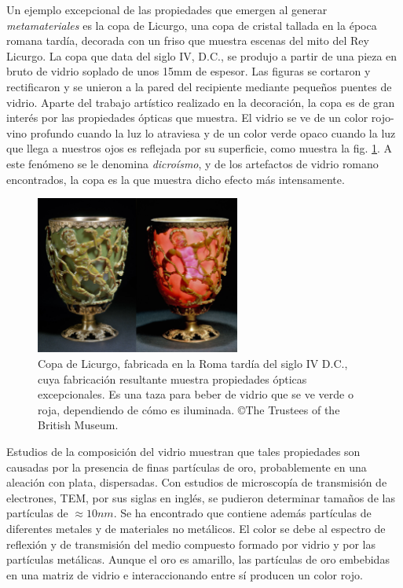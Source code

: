 \documentclass[12pt]{article}
\begin{document}
Un ejemplo excepcional de las propiedades que emergen al generar
\textit{metamateriales} es la copa de Licurgo, una copa de cristal
tallada en la época romana tardía, decorada con un friso que muestra
escenas del mito del Rey Licurgo. La copa que data del siglo IV, D.C.,
se produjo a partir de una pieza en bruto de vidrio soplado de unos
15mm de espesor. Las figuras se cortaron y rectificaron y se unieron a
la pared del recipiente mediante pequeños puentes de vidrio. Aparte
del trabajo artístico realizado en la decoración, la copa es de gran
interés por las propiedades ópticas que muestra. El vidrio se ve de
un color rojo-vino profundo cuando la luz lo atraviesa y de un color verde opaco
cuando la luz que llega a nuestros ojos es reflejada por su
superficie, como muestra la fig. \ref{Lycurgus}. A este fenómeno se le
denomina \textit{dicroísmo}, y de los artefactos de vidrio romano
encontrados, la copa es la que muestra dicho efecto más
intensamente. \cite{LycurgusInvestigation}
\begin{figure}
    \centering
    \includegraphics[width = 0.6\textwidth]{fig5.jpg}
    \caption{Copa de Licurgo, fabricada en la Roma tardía del siglo IV
      D.C., cuya fabricación resultante muestra propiedades ópticas
      excepcionales.  Es una taza para beber de vidrio que se ve verde
      o roja, dependiendo de cómo es iluminada.  ©The Trustees of the
      British Museum.}
    \label{Lycurgus}
\end{figure}
Estudios de la composición del vidrio muestran que tales propiedades
son causadas por la presencia de finas partículas de oro,
probablemente en una aleación con plata, dispersadas. Con estudios de
microscopía de transmisión de electrones, TEM, por sus siglas en
inglés, se pudieron determinar tamaños de las partículas de
$\approx 10 nm $.  Se ha encontrado que contiene además partículas de
diferentes metales y de materiales no metálicos. El color se debe al
espectro de reflexión y de transmisión del medio compuesto formado por
vidrio y por las partículas metálicas. Aunque el oro es amarillo, las
partículas de oro embebidas en una matriz de vidrio e interaccionando
entre sí producen un color rojo.
\end{document}
